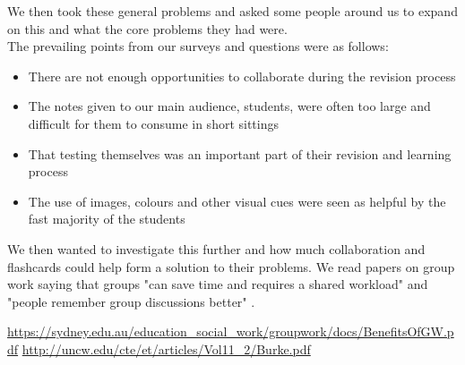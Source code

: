 \documentclass{article}
\begin{document}
We then took these general problems and asked some people around us to expand on this and what the core problems they had were.\\

The prevailing points from our surveys and questions were as follows:
\begin{itemize}
\item
	There are not enough opportunities to collaborate during the revision process
\item
	The notes given to our main audience, students, were often too large and difficult for them to consume in short sittings
\item
	That testing themselves was an important part of their revision and learning process
\item
	The use of images, colours and other visual cues were seen as helpful by the fast majority of the students
\end{itemize}

We then wanted to investigate this further and how much collaboration and flashcards could help form a solution to their problems.  We read papers on group work saying that groups "can save time and requires a shared workload" \cite{groupwork1} and "people remember group discussions better" \cite{groupwork2}.

\begin{thebibliography}{2}
		\url{https://sydney.edu.au/education_social_work/groupwork/docs/BenefitsOfGW.pdf}
		\url{http://uncw.edu/cte/et/articles/Vol11_2/Burke.pdf}
\end{thebibliography}
\end{document}
